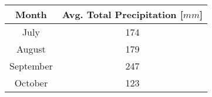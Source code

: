 \documentclass{article}
\begin{document}
\begin{table}[!htbp]
\begin{tabular}{c|c}
 {\bf Month} & Avg. Total Precipitation [$mm$]  \\ 
\hline \hline
 July  & 174  \\ \hline
 August  & 179  \\ \hline
 September  & 247  \\ \hline
 October & 123 \\
\end{tabular}
\end{table}
\end{document}
